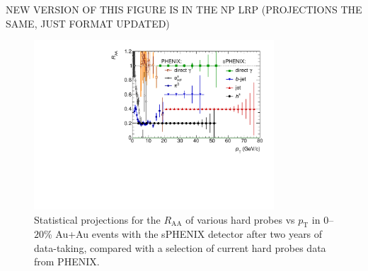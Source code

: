 NEW VERSION OF THIS FIGURE IS IN THE NP LRP (PROJECTIONS THE SAME, JUST FORMAT UPDATED)


\begin{figure}[p]
  \begin{center}

    \includegraphics[width=0.8\textwidth]{figs/sPHENIX_MIE_master_AuAu_projections_tshirtcompare}
  \end{center}

  \caption[Statistical projections of $R_\mathrm{AA}$ for hard probes
  in central Au+Au events with the sPHENIX detector after two years of
  data-taking, and kinematic reach of various jet quenching
  observables from previous and future RHIC and LHC
  data-taking]{\label{fig:guntherplot} Statistical projections
    for the $R_\mathrm{AA}$ of various hard probes vs $p_\mathrm{T}$
    in $0$--$20$\% Au+Au events with the sPHENIX detector after two
    years of data-taking, compared with a selection of current hard
    probes data from PHENIX.  
    }
\end{figure}

